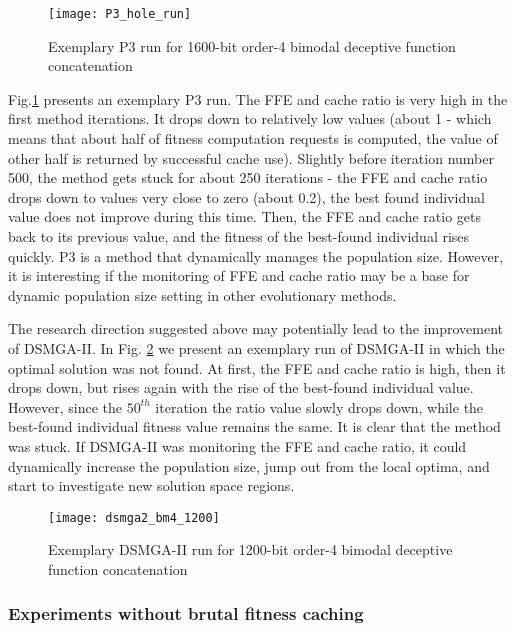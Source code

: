 \begin{figure}[h]
	\centering
	\texttt{[image: P3\_hole\_run]}
	\caption{Exemplary P3 run for 1600-bit order-4 bimodal deceptive function concatenation}
	\label{fig:p3_hole_run}
\end{figure}

Fig.\ref{fig:p3_hole_run} presents an exemplary P3 run. The FFE and cache ratio is very high in the first method iterations. It drops down to relatively low values (about 1 - which means that about half of fitness computation requests is computed, the value of other half is returned by successful cache use). Slightly before iteration number 500, the method gets stuck for about 250 iterations - the FFE and cache ratio drops down to values very close to zero (about 0.2), the best found individual value does not improve during this time. Then, the FFE and cache ratio gets back to its previous value, and the fitness of the best-found individual rises quickly. P3 is a method that dynamically manages the population size. However, it is interesting if the monitoring of FFE and cache ratio may be a base for dynamic population size setting in other evolutionary methods.\par

The research direction suggested above may potentially lead to the improvement of DSMGA-II. In Fig. \ref{fig:dsmga2_run} we present an exemplary run of DSMGA-II in which the optimal solution was not found. At first, the FFE and cache ratio is high, then it drops down, but rises again with the rise of the best-found individual value. However, since the $50^{th}$ iteration the ratio value slowly drops down, while the best-found individual fitness value remains the same. It is clear that the method was stuck. If DSMGA-II was monitoring the FFE and cache ratio, it could dynamically increase the population size, jump out from the local optima, and start to investigate new solution space regions.


\begin{figure}[h]
	\centering
	\texttt{[image: dsmga2\_bm4\_1200]}
	\caption{Exemplary DSMGA-II run for 1200-bit order-4 bimodal deceptive function concatenation}
	\label{fig:dsmga2_run}
\end{figure}




\subsubsection{Experiments without brutal fitness caching}


